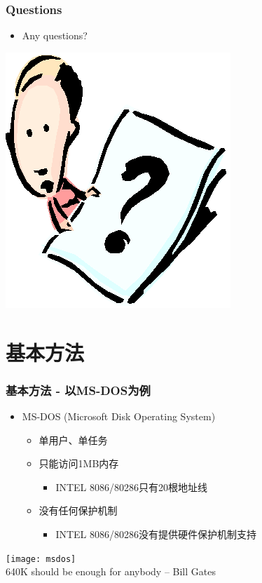 \documentclass[CJKutf8,xcolor=pdftex,dvipsnames,table]{beamer}
\begin{document}
\begin{CJK*}{UTF8}{song}
  \begin{frame}
  \frametitle{Questions}
  \begin{itemize}
  \item{Any questions?}
  \end{itemize}
  \begin{center}
    \includegraphics[scale=.5]{question}
  \end{center}
  \end{frame}

  \section{基本方法}

  \begin{frame}
  \frametitle{基本方法 - 以MS-DOS为例} \pause
  \begin{minipage}[c]{0.6\textwidth}
    \begin{itemize}
    \item{MS-DOS (Microsoft Disk Operating System)} \pause
      \begin{itemize}
      \item{单用户、单任务} \pause
      \item{只能访问1MB内存} \pause
        \begin{itemize}
        \item{INTEL 8086/80286只有20根地址线} \pause
        \end{itemize}
      \item{没有任何保护机制} \pause
        \begin{itemize}
        \item{INTEL 8086/80286没有提供硬件保护机制支持} \pause
        \end{itemize}
      \end{itemize}
    \end{itemize}
  \end{minipage}%
  \begin{minipage}[c]{0.4\textwidth}
    \centering
    \texttt{[image: msdos]} \\ \pause
    640K should be enough for anybody -- Bill Gates
  \end{minipage}
  \end{frame}


\end{CJK*}
\end{document}
